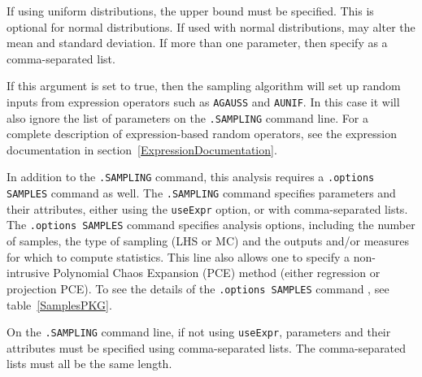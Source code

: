 \begin{Command}
\begin{Arguments}
If using uniform distributions, the upper bound must be specified.  This is optional for normal distributions.
  If used with normal distributions, may alter the mean and standard deviation.
  If more than one parameter, then specify as a comma-separated list.

If this argument is set to true, then the sampling algorithm will set up random 
  inputs from expression operators such as \verb|AGAUSS| and \verb|AUNIF|.  In 
  this case it will also ignore the list of parameters on the \verb|.SAMPLING| command line.
  For a complete description of expression-based random operators, see the expression
  documentation in section~\ref{ExpressionDocumentation}.

\end{Arguments}

\comments

In addition to the \verb|.SAMPLING| command, this analysis requires a 
  \verb|.options SAMPLES| command as well.  The \verb|.SAMPLING| command specifies 
  parameters and their attributes, either using the \verb|useExpr| option, or 
  with comma-separated lists.  The \verb|.options SAMPLES| command specifies 
  analysis options, including the number of samples, the type of sampling (LHS or MC)
  and the outputs and/or measures for which to compute statistics.
This line also allows one to specify a non-intrusive Polynomial Chaos 
Expansion (PCE) method (either regression or projection PCE).  
To see the details of the \verb|.options SAMPLES| command , see table~\ref{SamplesPKG}.

On the \verb|.SAMPLING| command line, if not using \verb|useExpr|, 
  parameters and their attributes must be specified 
  using comma-separated lists.  The comma-separated lists must all be the same length.

\end{Command}

